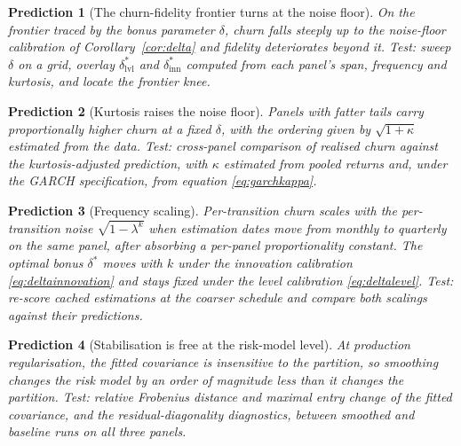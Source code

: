 \documentclass[11pt]{article}
\newtheorem{prediction}{Prediction}
\theoremstyle{remark}
\begin{document}
\begin{prediction}[The churn-fidelity frontier turns at the noise floor]
\label{pred:knee}
On the frontier traced by the bonus parameter $\delta$, churn falls steeply up
to the noise-floor calibration of Corollary~\ref{cor:delta} and fidelity
deteriorates beyond it. Test: sweep $\delta$ on a grid, overlay
$\delta^{*}_{\mathrm{lvl}}$ and $\delta^{*}_{\mathrm{inn}}$ computed from each
panel's span, frequency and kurtosis, and locate the frontier knee.
\end{prediction}

\begin{prediction}[Kurtosis raises the noise floor]
\label{pred:kurtosis}
Panels with fatter tails carry proportionally higher churn at a fixed
$\delta$, with the ordering given by $\sqrt{1+\kappa}$ estimated from the
data. Test: cross-panel comparison of realised churn against the
kurtosis-adjusted prediction, with $\kappa$ estimated from pooled returns and,
under the GARCH specification, from equation \eqref{eq:garchkappa}.
\end{prediction}

\begin{prediction}[Frequency scaling]
\label{pred:frequency}
Per-transition churn scales with the per-transition noise
$\sqrt{1-\lambda^{k}}$ when estimation dates move from monthly to quarterly on
the same panel, after absorbing a per-panel proportionality constant. The
optimal bonus $\delta^{*}$ moves with $k$ under the innovation calibration
\eqref{eq:deltainnovation} and stays fixed under the level calibration
\eqref{eq:deltalevel}. Test: re-score cached estimations at the coarser
schedule and compare both scalings against their predictions.
\end{prediction}

\begin{prediction}[Stabilisation is free at the risk-model level]
\label{pred:invariance}
At production regularisation, the fitted covariance is insensitive to the
partition, so smoothing changes the risk model by an order of magnitude less
than it changes the partition. Test: relative Frobenius distance and maximal
entry change of the fitted covariance, and the residual-diagonality
diagnostics, between smoothed and baseline runs on all three panels.
\end{prediction}
\end{document}
